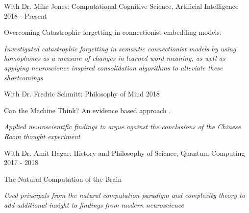 \begin{cventries}
\cvrpentry
    {With Dr. Mike Jones: Computational Cognitive Science, Artificial Intelligence} %
    {} %
    {} %
    {2018 - Present} %
    {
      \begin{cvrpitems} %
        \item {Overcoming Catastrophic forgetting in connectionist embedding models.}
            \begin{cvitemsdes} 
	     \item{\textit{Investigated catastrophic forgetting in semantic connectionist models by using homophones as a measure of changes in learned word meaning, as well as applying neuroscience inspired consolidation algorithms to alleviate these shortcomings}}
           \end{cvitemsdes} 
      \end{cvrpitems}
    }

\cvrpentry
    {With Dr. Fredric Schmitt: Philosophy of Mind} %
    {} %
    {} %
    {2018} %
    {
      \begin{cvrpitems} %
        \item {Can the Machine Think? An evidence based approach .}
            \begin{cvitemsdes} 
	     \item{\textit{Applied neuroscientific findings to argue against the conclusions of the Chinese Room thought experiment}}
           \end{cvitemsdes} 
      \end{cvrpitems}
    }

\cvrpentry
    {With Dr. Amit Hagar: History and Philosophy of Science; Quantum Computing} %
    {} %
    {} %
    {2017 - 2018 } %
    {
      \begin{cvrpitems} %
        \item {The Natural Computation of the Brain}
            \begin{cvitemsdes} 
	     \item{\textit{Used principals from the natural computation paradigm and complexity theory to add additional insight to findings from modern neuroscience}}
           \end{cvitemsdes} 
      \end{cvrpitems}
    }


\end{cventries}
